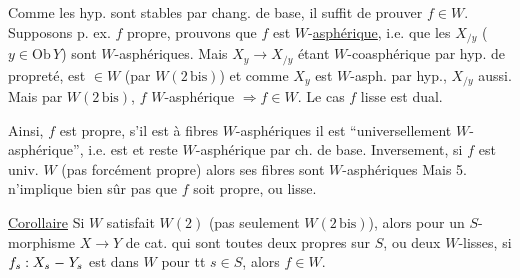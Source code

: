 Comme les hyp. sont stables par chang. de base, il suffit de prouver $f\in W$. Supposons p. ex. $f$ propre, prouvons que $f$ est $W$-\uline{asphérique}, i.e. que les $X_{/y}$ ($y\in\mathrm{Ob}\,Y$) sont $W$-asphériques. Mais $X_y\longrightarrow X_{/y}$ étant $W$-coasphérique par hyp. de propreté, est $\in W$ (par $W(2\,\mathrm{bis})$) et comme $X_y$ est $W$-asph. par hyp., $X_{/y}$ aussi. Mais par $W(2\,\mathrm{bis})$, $f$ $W$-asphérique $\Longrightarrow f\in W$. Le cas $f$ lisse est dual.

 Ainsi,  $f$ est propre, s'il est à fibres $W$-asphériques il est ``universellement $W$-asphérique'', i.e. est et reste $W$-asphérique par  ch.  de base. Inversement, si $f$ est univ.  $W$ (pas forcément propre) alors  ses fibres sont $W$-asphériques  Mais 5. n'implique bien sûr pas que $f$ soit propre, ou lisse.


\uline{Corollaire} Si $W$ satisfait $W(2)$ (pas seulement $W(2\,\mathrm{bis})$), alors pour un $S$-morphisme $X\longrightarrow Y$ de cat. qui sont toutes deux propres sur $S$, ou  deux $W$-lisses, si $f_s:X_s\mathrel{\relbar}Y_s$ est dans $W$ pour tt $s\in S$, alors $f\in W$.

